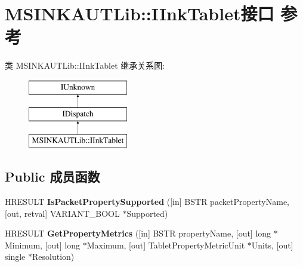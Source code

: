 \hypertarget{interface_m_s_i_n_k_a_u_t_lib_1_1_i_ink_tablet}{}\section{M\+S\+I\+N\+K\+A\+U\+T\+Lib\+:\+:I\+Ink\+Tablet接口 参考}
\label{interface_m_s_i_n_k_a_u_t_lib_1_1_i_ink_tablet}
类 M\+S\+I\+N\+K\+A\+U\+T\+Lib\+:\+:I\+Ink\+Tablet 继承关系图\+:\begin{figure}[H]
\begin{center}
\leavevmode
\includegraphics[height=3.000000cm]{interface_m_s_i_n_k_a_u_t_lib_1_1_i_ink_tablet}
\end{center}
\end{figure}
\subsection*{Public 成员函数}
\begin{DoxyCompactItemize}
\item 
\mbox{\label{interface_m_s_i_n_k_a_u_t_lib_1_1_i_ink_tablet_a376d7d390f9ee7e9505521eae4f7022b}} 
H\+R\+E\+S\+U\+LT {\bfseries Is\+Packet\+Property\+Supported} (\mbox{[}in\mbox{]} B\+S\+TR packet\+Property\+Name, \mbox{[}out, retval\mbox{]} V\+A\+R\+I\+A\+N\+T\+\_\+\+B\+O\+OL $\ast$Supported)
\item 
\mbox{\label{interface_m_s_i_n_k_a_u_t_lib_1_1_i_ink_tablet_a974cd76e30da0e879c4ef0a1c85cfc59}} 
H\+R\+E\+S\+U\+LT {\bfseries Get\+Property\+Metrics} (\mbox{[}in\mbox{]} B\+S\+TR property\+Name, \mbox{[}out\mbox{]} long $\ast$Minimum, \mbox{[}out\mbox{]} long $\ast$Maximum, \mbox{[}out\mbox{]} Tablet\+Property\+Metric\+Unit $\ast$Units, \mbox{[}out\mbox{]} single $\ast$Resolution)
\end{DoxyCompactItemize}
